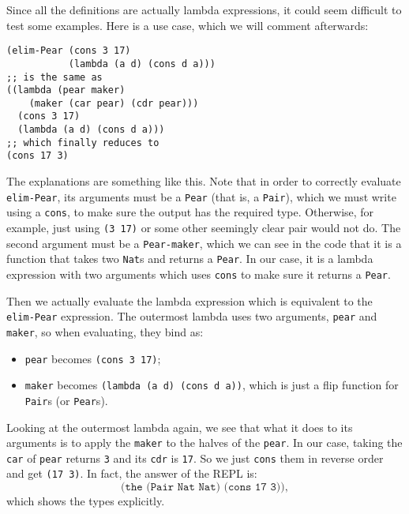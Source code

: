 Since all the definitions are actually lambda expressions, it could seem
difficult to test some examples. Here is a use case, which we will comment
afterwards:
{
  \small
\begin{verbatim}
(elim-Pear (cons 3 17)
           (lambda (a d) (cons d a)))
;; is the same as
((lambda (pear maker)
    (maker (car pear) (cdr pear)))
  (cons 3 17)
  (lambda (a d) (cons d a)))
;; which finally reduces to
(cons 17 3)
\end{verbatim}
}

The explanations are something like this. Note that in order to correctly
evaluate \texttt{elim-Pear}, its arguments must be a \texttt{Pear}
(that is, a  \texttt{Pair}), which we must write using a
\texttt{cons}, to make sure the output has the required type. Otherwise,
for example, just using \texttt{(3 17)} or some other seemingly clear
pair would not do. The second argument must be a \texttt{Pear-maker},
which we can see in the code that it is a function that takes two
\texttt{Nat}s and returns a \texttt{Pear}. In our case, it is a
lambda expression with two arguments which uses \texttt{cons} to make sure
it returns a \texttt{Pear}.

Then we actually evaluate the lambda expression which is equivalent to
the \texttt{elim-Pear} expression. The outermost lambda uses two arguments,
\texttt{pear} and \texttt{maker}, so when evaluating, they bind as:
\begin{itemize}
\item \texttt{pear} becomes \texttt{(cons 3 17)};
\item \texttt{maker} becomes \texttt{(lambda (a d) (cons d a))}, which
  is just a flip function for \texttt{Pair}s (or \texttt{Pear}s).
\end{itemize}
Looking at the outermost lambda again, we see that what it does to its arguments
is to apply the \texttt{maker} to the halves of the \texttt{pear}. In our case,
taking the \texttt{car} of \texttt{pear} returns \texttt{3} and its \texttt{cdr}
is \texttt{17}. So we just \texttt{cons} them in reverse order and get
\texttt{(17 3)}. In fact, the answer of the REPL is:
\[
  \texttt{(the (Pair Nat Nat) (cons 17 3))},
\]
which shows the types explicitly.


